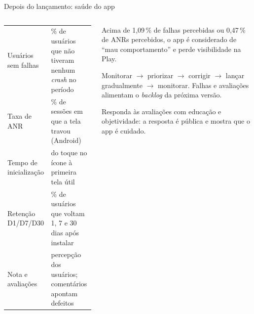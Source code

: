 \begin{frame}{Depois do lançamento: saúde do app}
  \begin{columns}[T]
    \begin{column}{0.5\textwidth}
      \scriptsize
      \begin{tabularx}{\linewidth}{@{}p{2.3cm} L@{}}
        \toprule
         &  \\
        \midrule
        Usuários sem falhas & \% de usuários que não tiveram nenhum \emph{crash} no período \\
        Taxa de ANR & \% de sessões em que a tela travou (Android) \\
        Tempo de inicialização & do toque no ícone à primeira tela útil \\
        Retenção D1/D7/D30 & \% de usuários que voltam 1, 7 e 30 dias após instalar \\
        Nota e avaliações & percepção dos usuários; comentários apontam defeitos \\
        \bottomrule
      \end{tabularx}
    \end{column}
    \begin{column}{0.48\textwidth}
      \begin{atencao}
        Acima de 1,09\,\% de falhas percebidas ou 0,47\,\% de ANRs percebidos, o app é considerado de ``mau comportamento'' e perde visibilidade na Play.
      \end{atencao}
      \begin{conceito}
        Monitorar $\rightarrow$ priorizar $\rightarrow$ corrigir $\rightarrow$ lançar gradualmente $\rightarrow$ monitorar. Falhas e avaliações alimentam o \emph{backlog} da próxima versão.
      \end{conceito}
      \begin{dica}
        Responda às avaliações com educação e objetividade: a resposta é pública e mostra que o app é cuidado.
      \end{dica}
    \end{column}
  \end{columns}
\end{frame}
